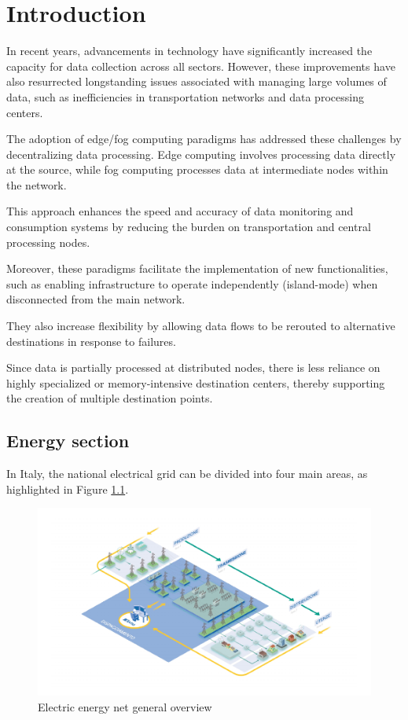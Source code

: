 \chapter{Introduction}
In recent years, advancements in technology have significantly increased the capacity for data collection across all sectors. However, these improvements have also resurrected longstanding issues associated with managing large volumes of data, such as inefficiencies in transportation networks and data processing centers.

The adoption of edge/fog computing paradigms has addressed these challenges by decentralizing data processing. Edge computing involves processing data directly at the source, while fog computing processes data at intermediate nodes within the network. 

This approach enhances the speed and accuracy of data monitoring and consumption systems by reducing the burden on transportation and central processing nodes.

Moreover, these paradigms facilitate the implementation of new functionalities, such as enabling infrastructure to operate independently (island-mode) when disconnected from the main network. 

They also increase flexibility by allowing data flows to be rerouted to alternative destinations in response to failures. 

Since data is partially processed at distributed nodes, there is less reliance on highly specialized or memory-intensive destination centers, thereby supporting the creation of multiple destination points.

\section{Energy section}

In Italy, the national electrical grid can be divided into four main areas, as highlighted in Figure \ref{fig:macroaree}.

\begin{figure}[ht]\centering
\includegraphics[scale=0.5]{Pictures/macro-aree}
\caption{Electric energy net general overview}\label{fig:macroaree}
\end{figure}


